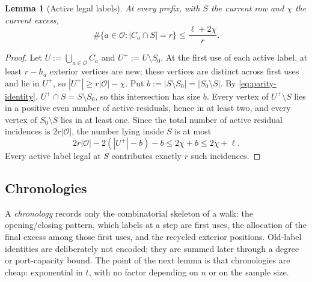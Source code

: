 \documentclass[11pt]{article}
\newtheorem{lemma}[lemma]{Lemma}
\theoremstyle{definition}
\theoremstyle{remark}
\newcommand{\1}{\mathbf 1}
\newcommand{\cO}{\mathcal O}
\numberwithin{equation}{section}
\begin{document}
\begin{lemma}[Active legal labels]\label{lem:active}
At every prefix, with $S$ the current row and $\chi$ the current excess,
\begin{equation}\label{eq:active}
 \#\{a\in\cO:|C_a\cap S|=r\}\le\frac{\ell+2\chi}{r}.
\end{equation}
\end{lemma}
\begin{proof}
Let $U:=\bigcup_{a\in\cO}C_a$ and $U^+:=U\setminus S_0$.  At the first
use of each active label, at least $r-h_a$ exterior vertices are new;
these vertices are distinct across first uses and lie in $U^+$, so
$|U^+|\ge r|\cO|-\chi$.  Put
$b:=|S\setminus S_0|=|S_0\setminus S|$.  By
\cref{eq:parity-identity}, $U^+\cap S=S\setminus S_0$, so this
intersection has size $b$.  Every vertex of $U^+\setminus S$ lies in a
positive even number of active residuals, hence in at least two, and every
vertex of $S_0\setminus S$ lies in at least one.  Since the total number
of active residual incidences is $2r|\cO|$, the number lying inside $S$ is
at most
\[
 2r|\cO|-2(|U^+|-b)-b\le2\chi+b\le2\chi+\ell.
\]
Every active label legal at $S$ contributes exactly $r$ such incidences.
\end{proof}

\subsection{Chronologies}

A \emph{chronology} records only the combinatorial skeleton of a walk:
the opening/closing pattern, which labels at a step are first uses, the
allocation of the final excess among those first uses, and the recycled
exterior positions.  Old-label identities are deliberately not encoded;
they are summed later through a degree or port-capacity bound.  The
point of the next lemma is that chronologies are cheap: exponential in
$t$, with no factor depending on $n$ or on the sample size.
\end{document}
